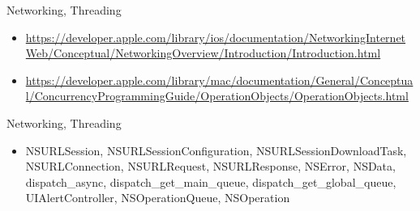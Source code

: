 \documentclass{beamer}
\begin{document}
\begin{frame}{Networking, Threading}
    \begin{itemize}
    \item {
        \url {https://developer.apple.com/library/ios/documentation/NetworkingInternetWeb/Conceptual/NetworkingOverview/Introduction/Introduction.html}
    }
    \item {
        \url {https://developer.apple.com/library/mac/documentation/General/Conceptual/ConcurrencyProgrammingGuide/OperationObjects/OperationObjects.html}
    }
    \end{itemize}
\end{frame}

\begin{frame}{Networking, Threading}
    \begin{itemize}
    \item {
        NSURLSession, NSURLSessionConfiguration, NSURLSessionDownloadTask, NSURLConnection, NSURLRequest, NSURLResponse, NSError, NSData, dispatch\_async, dispatch\_get\_main\_queue, dispatch\_get\_global\_queue, UIAlertController, NSOperationQueue, NSOperation
    }
    \end{itemize}
\end{frame}
\end{document}
